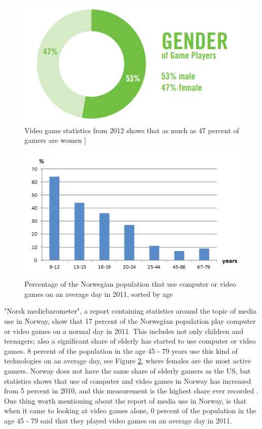 \begin{figure}
\begin{center}
\includegraphics[scale=0.7]{gendergameplayers}
\caption[Gender of gameplayer]{Video game statistics from 2012 shows that as much as 47 percent of gamers are women \cite{statistics2012real}]}
\label{fig:GenderGamePlayers}
\end{center}
\end{figure}
\begin{figure}
\begin{center}
\includegraphics[scale=0.9]{gamestatisticsnorway}
\caption[Use of computer or video games, Norway, 2011]{Percentage of the Norwegian population that use computer or video games on an average day in 2011, sorted by age \cite{ssb2011}}
\label{fig:GameStatisticsNorway}
\end{center}
\end{figure}
       
"Norsk mediebarometer", a report containing statistics around the topic of media use in Norway, show that 17 percent of the Norwegian population play computer or video games on a normal day in 2011. This includes not only children and teenagers; also a significant share of elderly has started to use computer or video games. 8 percent of the population in the age 45 - 79 years use this kind of technologies on an average day, see Figure \ref{fig:GameStatisticsNorway}, where females are the most active gamers. Norway does not have the same share of elderly gamers as the US, but statistics shows that use of computer and video games in Norway has increased from 5 percent in 2010, and this measurement is the highest share ever recorded \cite{ssb2010} \cite{ssb2011}. One thing worth mentioning about the report of media use in Norway, is that when it came to looking at video games alone, 0 percent of the population in the age 45 - 79 said that they played video games on an average day in 2011. \cite{ssb2011}

